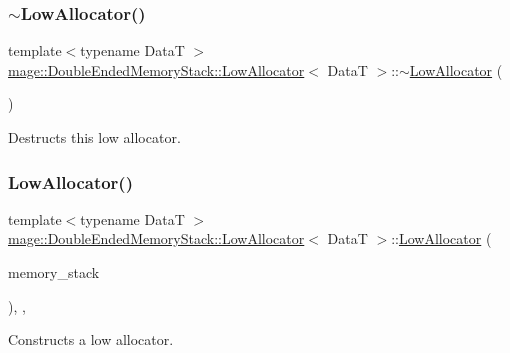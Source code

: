\subsubsection{\texorpdfstring{$\sim$\+Low\+Allocator()}{~LowAllocator()}}
{\footnotesize\ttfamily template$<$typename DataT $>$ \\
\hyperlink{classmage_1_1_double_ended_memory_stack_1_1_low_allocator}{mage\+::\+Double\+Ended\+Memory\+Stack\+::\+Low\+Allocator}$<$ DataT $>$\+::$\sim$\hyperlink{classmage_1_1_double_ended_memory_stack_1_1_low_allocator}{Low\+Allocator} (\begin{DoxyParamCaption}{ }\end{DoxyParamCaption})\hspace{0.3cm}{\ttfamily [default]}}

Destructs this low allocator. \hypertarget{classmage_1_1_double_ended_memory_stack_1_1_low_allocator_a8449525406fdc6da075cf1e3bb0c9332}{}\label{classmage_1_1_double_ended_memory_stack_1_1_low_allocator_a8449525406fdc6da075cf1e3bb0c9332} 
\subsubsection{\texorpdfstring{Low\+Allocator()}{LowAllocator()}\hspace{0.1cm}{\footnotesize\ttfamily [4/4]}}
{\footnotesize\ttfamily template$<$typename DataT $>$ \\
\hyperlink{classmage_1_1_double_ended_memory_stack_1_1_low_allocator}{mage\+::\+Double\+Ended\+Memory\+Stack\+::\+Low\+Allocator}$<$ DataT $>$\+::\hyperlink{classmage_1_1_double_ended_memory_stack_1_1_low_allocator}{Low\+Allocator} (\begin{DoxyParamCaption}\item[{\hyperlink{namespacemage_a8769f9d670d6b585ea306cb1062af94b}{Not\+Null}$<$ \hyperlink{classmage_1_1_double_ended_memory_stack}{Double\+Ended\+Memory\+Stack} $\ast$ $>$}]{memory\+\_\+stack }\end{DoxyParamCaption})\hspace{0.3cm}{\ttfamily [explicit]}, {\ttfamily [private]}, {\ttfamily [noexcept]}}

Constructs a low allocator.


